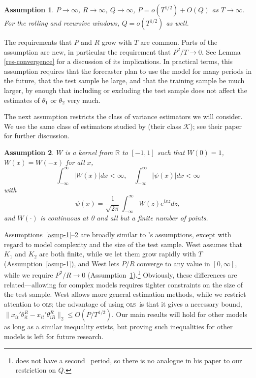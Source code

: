 \documentclass[11pt]{article}
\newtheorem{asmp}{Assumption}
\newcommand{\citepos}[1]{\citeauthor{#1}'s \citeyearpar{#1}}
\newcommand{\ols}{\textsc{ols}}
\renewcommand{\Re}{\ensuremath{\mathbb{R}}}
\begin{document}
\begin{asmp} \label{asmp-4} $P\to\infty$, $R\to\infty$, $Q\to\infty$,
  $P = o(T^{1/2}) + O(Q)$ as $T \to \infty$.  For the rolling and
  recursive windows, $Q = o(T^{1/2})$ as well.
\end{asmp}

The requirements that $P$ and $R$ grow with $T$ are common.  Parts of
the assumption are new, in particular the requirement that $P^2/T \to
0$.  See Lemma \ref{res-convergence} for a discussion of its
implications.  In practical terms, this assumption requires that the
forecaster plan to use the model for many periods in the future, that
the test sample be large, and that the training sample be much larger,
by enough that including or excluding the test sample does not affect
the estimates of $\theta_1$ or $\theta_2$ very much.

The next assumption restricts the class of variance estimators we will
consider.  We use the same class of estimators studied by
\citet{JoD:00} (their class $\mathcal{K}$); see
their paper for further discussion.

\begin{asmp}
  \label{asmp-5} $W$ is a kernel from 
$\Re$ to $[-1,1]$ such that $W(0) = 1$, $W(x) = W(-x)$ for all $x$,
\begin{equation*}
    \int_{-\infty}^{\infty} \lvert W(x) \rvert dx < \infty, \quad
    \int_{-\infty}^{\infty} \lvert \psi(x) \rvert dx < \infty
\end{equation*}
with
\begin{equation*} \psi(x) = \frac1{\sqrt{2\pi}} \int_{-\infty}^{\infty} W(z) e^{ixz}dz,
\end{equation*}
and $W(\cdot)$ is continuous at 0 and all but a finite number of
points.
\end{asmp}

Assumptions~\ref{asmp-1}--\ref{asmp-5} are broadly similar to
\citepos{Wes:96} assumptions, except with regard to model complexity
and the size of the test sample.  West assumes that $K_1$ and $K_2$
are both finite, while we let them grow rapidly with $T$
(Assumption~\ref{asmp-1}), and West lets $P/R$ converge to any value
in $[0,\infty]$, while we require $P^2/R \to 0$
(Assumption~\ref{asmp-4}).\footnote{\citet{Wes:96} does not have a
  second \oos\ period, so there is no analogue in his paper to our
  restriction on $Q$.}  Obviously, these differences are
related---allowing for complex models requires tighter constraints on
the size of the test sample.  West allows more general estimation
methods, while we restrict attention to \ols; the advantage of using
\ols\ is that it gives a necessary bound, $\| x_{it}' \theta_{it}^{R} - x_{it}'
\theta_{iR}^R \|_2 \leq O(P/T^{1/2})$.  Our main results will hold for
other models as long as a similar inequality exists, but proving such
inequalities for other models is left for future research.
\end{document}
